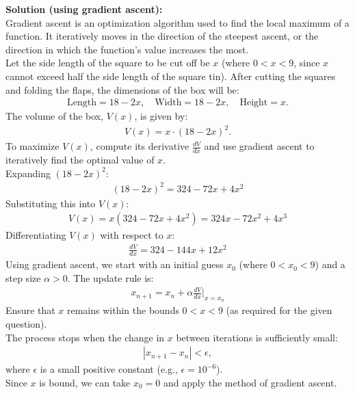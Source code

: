 \documentclass[journal]{IEEEtran}
\begin{document}
\textbf{Solution (using gradient ascent):} \\
Gradient ascent is an optimization algorithm used to find the local maximum of a function. It iteratively moves in the direction of the steepest ascent, or the direction in which the function's value increases the most. \\
Let the side length of the square to be cut off be $x$ (where $0 < x < 9$, since $x$ cannot exceed half the side length of the square tin). After cutting the squares and folding the flaps, the dimensions of the box will be:
\begin{align}
\text{Length} = 18 - 2x, \quad \text{Width} = 18 - 2x, \quad \text{Height} = x.
\end{align}
The volume of the box, $V(x)$, is given by: 
\begin{align}
V(x) = x \cdot (18 - 2x)^2.
\end{align}
To maximize $V(x)$, compute its derivative $\frac{dV}{dx}$ and use gradient ascent to iteratively find the optimal value of $x$. \\
Expanding $(18 - 2x)^2$:
\begin{align}
(18 - 2x)^2 = 324 - 72x + 4x^2
\end{align}
Substituting this into $V(x)$:
\begin{align}
V(x) = x(324 - 72x + 4x^2) = 324x - 72x^2 + 4x^3
\end{align}
Differentiating $V(x)$ with respect to $x$:
\begin{align}
\frac{dV}{dx} = 324 - 144x + 12x^2
\end{align}
Using gradient ascent, we start with an initial guess $x_0$ (where $0 < x_0 < 9$) and a step size $\alpha > 0$. The update rule is:
\begin{align}
x_{n+1} = x_n + \alpha \frac{dV}{dx}\bigg|_{x = x_n}
\end{align}
Ensure that $x$ remains within the bounds $0 < x < 9$ (as required for the given question). \\
The process stops when the change in $x$ between iterations is sufficiently small:
\begin{align}
|x_{n+1} - x_n| < \epsilon,
\end{align}
where $\epsilon$ is a small positive constant (e.g., $\epsilon = 10^{-6}$). \\
Since $x$ is bound, we can take $x_0 = 0$ and apply the method of gradient ascent.
\end{document}
